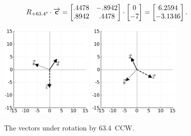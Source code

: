 \vspace{-.2in}
\begin{align*}
R_{+63.4\degree} \cdot \overrightarrow{\textbf{c}} &=
\begin{bmatrix}
.4478 & -.8942 \\
.8942 & .4478 \\
\end{bmatrix} \cdot
\begin{bmatrix}
0 \\ -7 \\
\end{bmatrix} =
\begin{bmatrix}
6.2594 \\ -3.1346 \\
\end{bmatrix}.
\end{align*}

\begin{figure}[hb]
\centering
\includegraphics[width=0.40\textwidth]{preoperators.png}
\includegraphics[width=0.40\textwidth]{rotate634op.png}
\caption[.]{The vectors under rotation by 63.4\textdegree\ CCW.}
\label{fig:rotate634op}
\end{figure}


